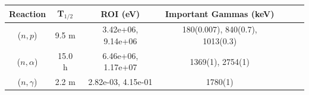 \begin{figure}[!ht]
   \centering
   \quad
   \\ 
   \quad 
   \\ 

\end{figure}

\begin{table}[h]
\centering
\begin{tabular}{ |c|c|c|c|c|c|c| }
 \hline
 Reaction & T$_{1/2}$ & ROI (eV) & Important Gammas (keV) \\
 \hline 
 ($n,p$) &  9.5 m & 3.42e+06, 9.14e+06 & 180(0.007), 840(0.7), 1013(0.3) \\ 
\hline
 ($n,\alpha$) & 15.0 h & 6.46e+06, 1.17e+07 & 1369(1), 2754(1) \\ 
\hline
 ($n,\gamma$) &  2.2 m & 2.82e-03, 4.15e-01 & 1780(1) \\ 
\hline
\end{tabular}
\end{table}

